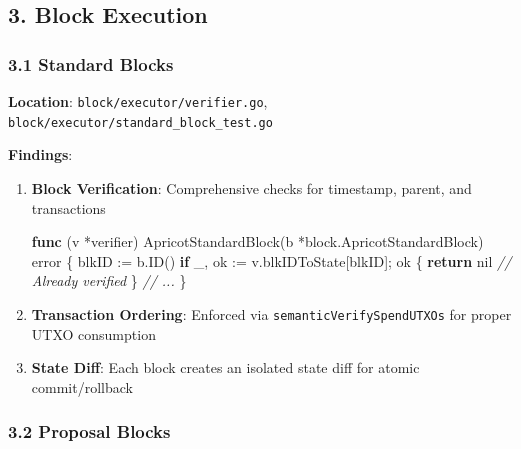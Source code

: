 \documentclass[
]{article}
\newenvironment{Shaded}{}{}
\newcommand{\CommentTok}[1]{\textcolor[rgb]{0.38,0.63,0.69}{\textit{#1}}}
\newcommand{\ControlFlowTok}[1]{\textcolor[rgb]{0.00,0.44,0.13}{\textbf{#1}}}
\newcommand{\DataTypeTok}[1]{\textcolor[rgb]{0.56,0.13,0.00}{#1}}
\newcommand{\KeywordTok}[1]{\textcolor[rgb]{0.00,0.44,0.13}{\textbf{#1}}}
\newcommand{\NormalTok}[1]{#1}
\newcommand{\OperatorTok}[1]{\textcolor[rgb]{0.40,0.40,0.40}{#1}}
\newcommand{\OtherTok}[1]{\textcolor[rgb]{0.00,0.44,0.13}{#1}}
\begin{document}
\subsection{3. Block Execution}\label{3-block-execution}

\subsubsection{3.1 Standard Blocks}\label{31-standard-blocks}

\textbf{Location}: \texttt{block/executor/verifier.go},
\texttt{block/executor/standard\_block\_test.go}

\textbf{Findings}:

\begin{enumerate}
\def\labelenumi{\arabic{enumi}.}
\item
  \textbf{Block Verification}: Comprehensive checks for timestamp,
  parent, and transactions

\begin{Shaded}
\begin{Highlighting}[]
\KeywordTok{func} \OperatorTok{(}\NormalTok{v }\OperatorTok{*}\NormalTok{verifier}\OperatorTok{)}\NormalTok{ ApricotStandardBlock}\OperatorTok{(}\NormalTok{b }\OperatorTok{*}\NormalTok{block}\OperatorTok{.}\NormalTok{ApricotStandardBlock}\OperatorTok{)} \DataTypeTok{error} \OperatorTok{\{}
\NormalTok{    blkID }\OperatorTok{:=}\NormalTok{ b}\OperatorTok{.}\NormalTok{ID}\OperatorTok{()}
    \ControlFlowTok{if}\NormalTok{ \_}\OperatorTok{,}\NormalTok{ ok }\OperatorTok{:=}\NormalTok{ v}\OperatorTok{.}\NormalTok{blkIDToState}\OperatorTok{[}\NormalTok{blkID}\OperatorTok{];}\NormalTok{ ok }\OperatorTok{\{}
        \ControlFlowTok{return} \OtherTok{nil} \CommentTok{// Already verified}
    \OperatorTok{\}}
    \CommentTok{// ...}
\OperatorTok{\}}
\end{Highlighting}
\end{Shaded}
\item
  \textbf{Transaction Ordering}: Enforced via
  \texttt{semanticVerifySpendUTXOs} for proper UTXO consumption
\item
  \textbf{State Diff}: Each block creates an isolated state diff for
  atomic commit/rollback
\end{enumerate}

\subsubsection{3.2 Proposal Blocks}\label{32-proposal-blocks}
\end{document}
